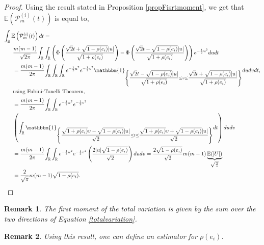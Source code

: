 \documentclass[12pt]{article}
\theoremstyle{Theorem}
\newtheorem{remark}{Remark}
\begin{document}
\begin{proof}
Using the result stated in Proposition \ref{propFisrtmoment}, we get that $\mathbb{E}\left(\mathcal{P}^{\scriptscriptstyle  (i)}_{m}(t) \right)$ is equal to,
{\small
\begin{align*}
\int_{\mathbb{R}} \mathbb{E}\left(\mathcal{P}^{(i)}_{m}(t)\right) dt & = \\
& \hspace{-2cm}\cfrac{m(m-1)}{\sqrt{2\pi}} \int_{\mathbb{R}}\int_{\mathbb{R}} \left(\Phi\left(\dfrac{\sqrt{2}t + \sqrt{1-\rho(e_i)}|u|}{\sqrt{1+\rho(e_i)}}\right) - \Phi\left(\dfrac{\sqrt{2}t - \sqrt{1-\rho(e_i)}|u|}{\sqrt{1+\rho(e_i)}}\right)\right)e^{-\frac{1}{2}u^2}dudt \\
& \hspace{-2cm}=\cfrac{m(m-1)}{2\pi} \int_{\mathbb{R}}\int_{\mathbb{R}}\int_{\mathbb{R}} e^{-\frac{1}{2}u^2}e^{-\frac{1}{2}v^2} \mathbbm{1}_{\left\{\dfrac{\sqrt{2}t - \sqrt{1-\rho(e_i)}|u|}{\sqrt{1+\rho(e_i)}}\leq v \leq\dfrac{\sqrt{2}t + \sqrt{1-\rho(e_i)}|u|}{\sqrt{1+\rho(e_i)}}\right\}} du dv dt ,\\
& \hspace{-2cm}\text{using Fubini-Tonelli Theorem,} \\
& \hspace{-2cm}= \cfrac{m(m-1)}{2\pi}\int_{\mathbb{R}}\int_{\mathbb{R}} e^{-\frac{1}{2}u^2}e^{-\frac{1}{2}v^2} \\
& \hspace{-2cm} \left(\int_{\mathbb{R}} \mathbbm{1}_{\left\{\dfrac{\sqrt{1+\rho(e_i)}v - \sqrt{1-\rho(e_i)}|u|}{\sqrt{2}}\leq t\leq\dfrac{\sqrt{1+\rho(e_i)}v + \sqrt{1-\rho(e_i)}|u|}{\sqrt{2}}\right\}} dt\right) du dv \\
& \hspace{-2cm}= \cfrac{m(m-1)}{2\pi} \int_{\mathbb{R}}\int_{\mathbb{R}} e^{-\frac{1}{2}u^2}e^{-\frac{1}{2}v^2}\left(\dfrac{2|u|\sqrt{1-\rho(e_i)}}{\sqrt{2}}\right)dudv = \frac{2\sqrt{1-\rho(e_i)}}{\sqrt{2}} m(m-1)\underbrace{\mathbb{E}(|U|)}_{\sqrt{\frac{2}{\pi}}}\\
&\hspace{-2cm}=\frac{2}{\sqrt{\pi}}m(m-1)\sqrt{1-\rho(e_i)}.
\end{align*}
}
\end{proof}
\begin{remark}
The first moment of the total variation is given by the sum over the two directions of Equation \eqref{totalvariation}. 
\end{remark}
\begin{remark}
Using this result, one can define an estimator for $\rho(e_i)$. 
\end{remark}
\end{document}
